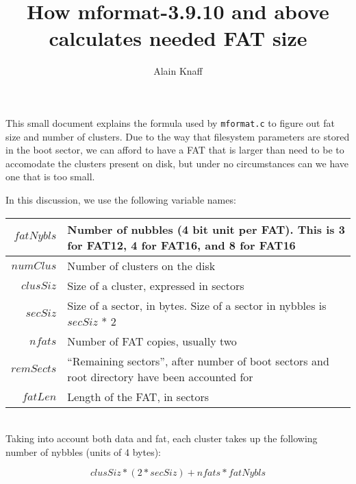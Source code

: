 \documentclass[a4paper,12pt]{article}
\author{Alain Knaff}
\title{How mformat-3.9.10 and above calculates needed FAT size}
\begin{document}
\maketitle

This small document explains the formula used by {\tt mformat.c} to
figure out fat size and number of clusters. Due to the way that
filesystem parameters are stored in the boot sector, we can afford to
have a FAT that is larger than need to be to accomodate the clusters
present on disk, but under no circumstances can we have one that is
too small.

In this discussion, we use the following variable names:

\begin{tabular}{|r|p{12cm}|}

\hline

$fatNybls$&
Number of nubbles (4 bit unit per FAT). This is 3 for FAT12, 4 for
FAT16, and 8 for FAT16\\

\hline

$numClus$&
Number of clusters on the disk\\

\hline

$clusSiz$&
Size of a cluster, expressed in sectors\\

\hline

$secSiz$&
Size of a sector, in bytes. Size of a sector in nybbles is $secSiz$ * 2\\

\hline

$nfats$&
Number of FAT copies, usually two\\

\hline

$remSects$&
``Remaining sectors'', after number of boot sectors and root directory
have been accounted for\\

\hline

$fatLen$&
Length of the FAT, in sectors\\

\hline


\end{tabular}

\ \\

Taking into account both data and fat, each cluster takes up the
following number of nybbles (units of 4 bytes):


$$clusSiz * (2*secSiz)  + nfats * fatNybls$$
	
\end{document}
